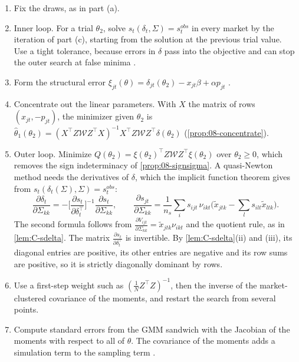 \begin{enumerate}
  \item Fix the draws, as in part (a).
  \item Inner loop. For a trial $\theta_2$, solve $s_t(\delta_t, \Sigma) = s^{obs}_t$ in every market by the iteration
  of part (c), starting from the solution at the previous trial value. Use a tight tolerance, because errors in
  $\delta$ pass into the objective and can stop the outer search at false minima \citep{DubeFoxSu2012}.
  \item Form the structural error $\xi_{jt}(\theta) = \delta_{jt}(\theta_2) - x_{jt}\beta + \alpha p_{jt}$
  \citep[eq.~13, p.~533]{Nevo2000a}.
  \item Concentrate out the linear parameters. With $X$ the matrix of rows $(x_{jt}, -p_{jt})$, the minimizer given
  $\theta_2$ is $\hat\theta_1(\theta_2) = (X^\top Z\mathcal{W}Z^\top X)^{-1}X^\top Z\mathcal{W}Z^\top\delta(\theta_2)$
  (\cref{prop:08-concentrate}).
  \item Outer loop. Minimize $Q(\theta_2) = \xi(\theta_2)^\top Z\mathcal{W}Z^\top\xi(\theta_2)$ \citep[eq.~9]{Nevo2000a} over
  $\theta_2 \ge 0$, which removes the sign indeterminacy of \cref{prop:08-signsigma}. A quasi-Newton method needs the
  derivatives of $\delta$, which the implicit function theorem gives from $s_t(\delta_t(\Sigma), \Sigma) = s^{obs}_t$:
  \begin{equation}\label{eq:C-ddelta-dsigma}
    \frac{\partial\delta_t}{\partial\Sigma_{kk}} = -\Big[\frac{\partial s_t}{\partial\delta_t^\top}\Big]^{-1}
    \frac{\partial s_t}{\partial\Sigma_{kk}} , \qquad
    \frac{\partial s_{jt}}{\partial\Sigma_{kk}} = \frac{1}{n_s}\sum_i s_{ijt}\,\nu_{ikt}\Big(\tilde x_{jtk} -
    \sum_ls_{ilt}\tilde x_{ltk}\Big) .
  \end{equation}
  The second formula follows from $\frac{\partial V_{ijt}}{\partial\Sigma_{kk}} = \tilde x_{jtk}\nu_{ikt}$ and the
  quotient rule, as in \cref{lem:C-sdelta}. The matrix $\frac{\partial s_t}{\partial\delta_t^\top}$ is invertible. By
  \cref{lem:C-sdelta}(ii) and (iii), its diagonal entries are positive, its other entries are negative and its row
  sums are positive, so it is strictly diagonally dominant by rows.
  \item Use a first-step weight such as $(\frac{1}{N}Z^\top Z)^{-1}$, then the inverse of the market-clustered
  covariance of the moments, and restart the search from several points.
  \item Compute standard errors from the GMM sandwich with the Jacobian of the moments with respect to all of
  $\theta$. The covariance of the moments adds a simulation term to the sampling term \citep{BerryLevinsohnPakes1995}.
\end{enumerate}

